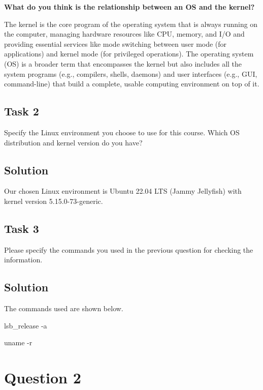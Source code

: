 \documentclass[../main.tex]{subfiles}
\begin{document}
\textbf{What do you think is the relationship between an OS and the kernel?}

The kernel is the core program of the operating system that is always running on the computer, managing hardware resources like CPU, memory, and I/O and providing essential services like mode switching between user mode (for applications) and kernel mode (for privileged operations). The operating system (OS) is a broader term that encompasses the kernel but also includes all the system programs (e.g., compilers, shells, daemons) and user interfaces (e.g., GUI, command-line) that build a complete, usable computing environment on top of it.

\subsection{Task 2} \label{sec:q1t2}

Specify the Linux environment you choose to use for this course. Which OS distribution and kernel version do you have?

\subsection*{Solution}

Our chosen Linux environment is Ubuntu 22.04 LTS (Jammy Jellyfish) with kernel version 5.15.0-73-generic.

\subsection{Task 3}

Please specify the commands you used in the previous question for checking the information.

\subsection*{Solution}

The commands used are shown below.

\begin{bashcmd}[title=Show OS distribution]
lsb_release -a
\end{bashcmd}

\begin{bashcmd}[title=Show kernel version]
uname -r
\end{bashcmd}

\newpage
\section{Question 2}
\end{document}
